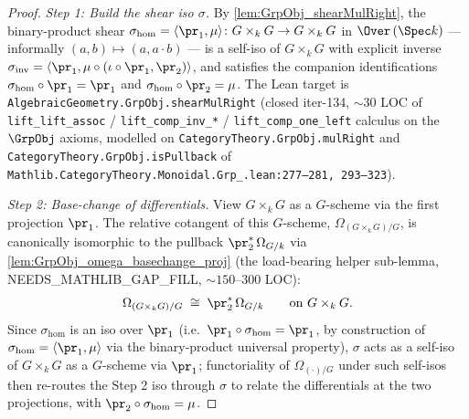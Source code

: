 \begin{proof}
  


  \emph{Step 1: Build the shear iso \(\sigma\).} By \cref{lem:GrpObj_shearMulRight}, the binary-product shear \(\sigma_{\mathrm{hom}} = \langle \pr_{1}, \mu \rangle \colon G \times_{k} G \to G \times_{k} G\) in \(\Over\,(\Spec k)\) — informally \((a, b) \mapsto (a, a \cdot b)\) — is a self-iso of \(G \times_{k} G\) with explicit inverse \(\sigma_{\mathrm{inv}} = \langle \pr_{1}, \mu \circ (\iota \circ \pr_{1}, \pr_{2}) \rangle\), and satisfies the companion identifications \(\sigma_{\mathrm{hom}} \circ \pr_{1} = \pr_{1}\) and \(\sigma_{\mathrm{hom}} \circ \pr_{2} = \mu\). The Lean target is \texttt{AlgebraicGeometry.GrpObj.shearMulRight} (closed iter-134, \(\sim 30\) LOC of \texttt{lift\_lift\_assoc} / \texttt{lift\_comp\_inv\_*} / \texttt{lift\_comp\_one\_left} calculus on the \(\GrpObj\) axioms, modelled on \texttt{CategoryTheory.GrpObj.mulRight} and \texttt{CategoryTheory.GrpObj.isPullback} of \texttt{Mathlib.CategoryTheory.Monoidal.Grp\_.lean:277--281,\,293--323}).

  \emph{Step 2: Base-change of differentials.} View \(G \times_{k} G\) as a \(G\)-scheme via the first projection \(\pr_{1}\). The relative cotangent of this \(G\)-scheme, \(\Omega_{(G \times_{k} G)/G}\), is canonically isomorphic to the pullback \(\pr_{2}^{*}\,\Omega_{G/k}\) via \cref{lem:GrpObj_omega_basechange_proj} (the load-bearing helper sub-lemma, NEEDS\_MATHLIB\_GAP\_FILL, \(\sim 150\)--\(300\) LOC):
  \[
    \Omega_{(G \times_{k} G)/G} \;\cong\; \pr_{2}^{*}\,\Omega_{G/k} \qquad \text{on } G \times_{k} G.
  \]
  Since \(\sigma_{\mathrm{hom}}\) is an iso over \(\pr_{1}\) (i.e.\ \(\pr_{1} \circ \sigma_{\mathrm{hom}} = \pr_{1}\), by construction of \(\sigma_{\mathrm{hom}} = \langle \pr_{1}, \mu \rangle\) via the binary-product universal property), \(\sigma\) acts as a self-iso of \(G \times_{k} G\) as a \(G\)-scheme via \(\pr_{1}\); functoriality of \(\Omega_{(\cdot)/G}\) under such self-isos then re-routes the Step 2 iso through \(\sigma\) to relate the differentials at the two projections, with \(\pr_{2} \circ \sigma_{\mathrm{hom}} = \mu\).


\end{proof}
